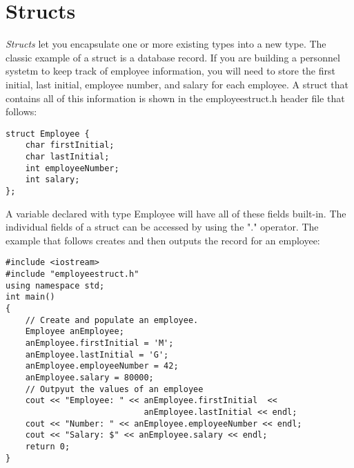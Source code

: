 \documentclass{article}
\begin{document}
\section{Structs}
\textit{Structs} let you encapsulate one or more existing types into a new type. The classic example
of a struct is a database record. If you are building a personnel systetm to keep track of employee
information, you will need to store the first initial, last initial, employee number, and salary for
each employee. A struct that contains all of this information is shown in the employeestruct.h header
file that follows:
\begin{verbatim}
struct Employee {
    char firstInitial;
    char lastInitial;
    int employeeNumber;
    int salary;
};
\end{verbatim}
A variable declared with type Employee will have all of these fields built-in. The individual fields
of a struct can be accessed by using the "." operator. The example that follows creates and then
outputs the record for an employee:
\begin{verbatim}
#include <iostream>
#include "employeestruct.h"
using namespace std;
int main()
{
    // Create and populate an employee.
    Employee anEmployee;
    anEmployee.firstInitial = 'M';
    anEmployee.lastInitial = 'G';
    anEmployee.employeeNumber = 42;
    anEmployee.salary = 80000;
    // Outpyut the values of an employee
    cout << "Employee: " << anEmployee.firstInitial  << 
                            anEmployee.lastInitial << endl;
    cout << "Number: " << anEmployee.employeeNumber << endl;
    cout << "Salary: $" << anEmployee.salary << endl;
    return 0;
}
  
\end{verbatim}
\end{document}
